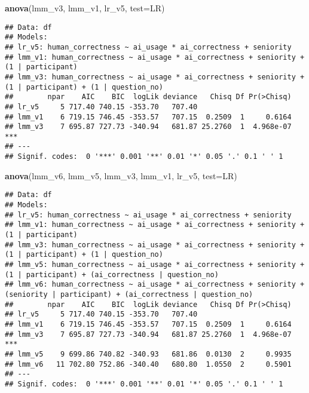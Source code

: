 \documentclass[
]{article}
\newenvironment{Shaded}{\begin{snugshade}}{\end{snugshade}}
\newcommand{\AttributeTok}[1]{\textcolor[rgb]{0.13,0.29,0.53}{#1}}
\newcommand{\FunctionTok}[1]{\textcolor[rgb]{0.13,0.29,0.53}{\textbf{#1}}}
\newcommand{\NormalTok}[1]{#1}
\newcommand{\StringTok}[1]{\textcolor[rgb]{0.31,0.60,0.02}{#1}}
\begin{document}
\begin{Shaded}
\begin{Highlighting}[]
\FunctionTok{anova}\NormalTok{(lmm\_v3, lmm\_v1, lr\_v5, }\AttributeTok{test=}\StringTok{\textquotesingle{}LR\textquotesingle{}}\NormalTok{)}
\end{Highlighting}
\end{Shaded}

\begin{verbatim}
## Data: df
## Models:
## lr_v5: human_correctness ~ ai_usage * ai_correctness + seniority
## lmm_v1: human_correctness ~ ai_usage * ai_correctness + seniority + (1 | participant)
## lmm_v3: human_correctness ~ ai_usage * ai_correctness + seniority + (1 | participant) + (1 | question_no)
##        npar    AIC    BIC  logLik deviance   Chisq Df Pr(>Chisq)    
## lr_v5     5 717.40 740.15 -353.70   707.40                          
## lmm_v1    6 719.15 746.45 -353.57   707.15  0.2509  1     0.6164    
## lmm_v3    7 695.87 727.73 -340.94   681.87 25.2760  1  4.968e-07 ***
## ---
## Signif. codes:  0 '***' 0.001 '**' 0.01 '*' 0.05 '.' 0.1 ' ' 1
\end{verbatim}

\begin{Shaded}
\begin{Highlighting}[]
\FunctionTok{anova}\NormalTok{(lmm\_v6, lmm\_v5, lmm\_v3, lmm\_v1, lr\_v5, }\AttributeTok{test=}\StringTok{\textquotesingle{}LR\textquotesingle{}}\NormalTok{)}
\end{Highlighting}
\end{Shaded}

\begin{verbatim}
## Data: df
## Models:
## lr_v5: human_correctness ~ ai_usage * ai_correctness + seniority
## lmm_v1: human_correctness ~ ai_usage * ai_correctness + seniority + (1 | participant)
## lmm_v3: human_correctness ~ ai_usage * ai_correctness + seniority + (1 | participant) + (1 | question_no)
## lmm_v5: human_correctness ~ ai_usage * ai_correctness + seniority + (1 | participant) + (ai_correctness | question_no)
## lmm_v6: human_correctness ~ ai_usage * ai_correctness + seniority + (seniority | participant) + (ai_correctness | question_no)
##        npar    AIC    BIC  logLik deviance   Chisq Df Pr(>Chisq)    
## lr_v5     5 717.40 740.15 -353.70   707.40                          
## lmm_v1    6 719.15 746.45 -353.57   707.15  0.2509  1     0.6164    
## lmm_v3    7 695.87 727.73 -340.94   681.87 25.2760  1  4.968e-07 ***
## lmm_v5    9 699.86 740.82 -340.93   681.86  0.0130  2     0.9935    
## lmm_v6   11 702.80 752.86 -340.40   680.80  1.0550  2     0.5901    
## ---
## Signif. codes:  0 '***' 0.001 '**' 0.01 '*' 0.05 '.' 0.1 ' ' 1
\end{verbatim}
\end{document}
